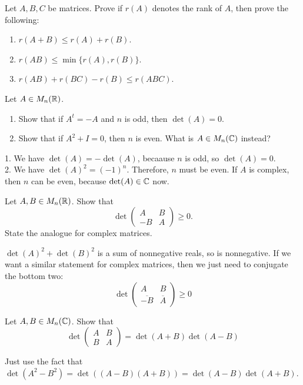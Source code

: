 \begin{exercise}
Let $A,B,C$ be matrices. Prove if $r(A)$ denotes the rank of $A$, then 
prove the following:
\begin{enumerate}
    \item $r(A+B)\leq r(A)+r(B)$.
    \item $r(AB)\leq \min\{r(A),r(B)\}$.
    \item $r(AB)+r(BC)-r(B)\leq r(ABC)$.
\end{enumerate}
\end{exercise}
\begin{solution}

\end{solution}

\begin{exercise}
Let $A \in M_n(\mathbb{R})$.
\begin{enumerate}
    \item Show that if $A^t=-A$ and $n$ is odd, then $\det(A) = 0$.
    \item Show that if $A^2 + I = 0$, then $n$ is even. What is $A \in M_n(\mathbb{C})$ instead?
\end{enumerate}
\end{exercise}
\begin{solution}
    1. We have $\det(A) = -\det(A)$, becaause $n$ is odd, so $\det(A) = 0$. \\

    2. We have $\det(A)^2 = (-1)^n$. Therefore, $n$ must be even. If $A$ is complex,
    then $n$ can be even, because $\det(A) \in \mathbb{C}$ now.
\end{solution}

\begin{exercise}
Let $A, B \in M_n(\mathbb{R})$. Show that
\[
\det 
\begin{pmatrix}
A & B\\
-B & A
\end{pmatrix} \geq 0.
\]
State the analogue for complex matrices.
\end{exercise}
\begin{solution}
$\det(A)^2 + \det(B)^2$ is a sum of nonnegative reals, so is nonnegative. If we 
want a similar statement for complex matrices, then we just need to conjugate the bottom two:
\[
\det 
\begin{pmatrix}
A & B\\
\overline{-B} & \overline{A}
\end{pmatrix} \geq 0
\]
\end{solution}

\begin{exercise}
Let $A, B \in M_n(\mathbb{C})$. Show that
\[
\det
\begin{pmatrix}
A & B\\
B & A
\end{pmatrix}
=
\det(A + B) \det(A - B)
\]
\end{exercise}
\begin{solution}
    Just use the fact that $\det(A^2 - B^2) = \det((A - B)(A + B)) = \det(A - B)\det(A+B)$.
\end{solution}


